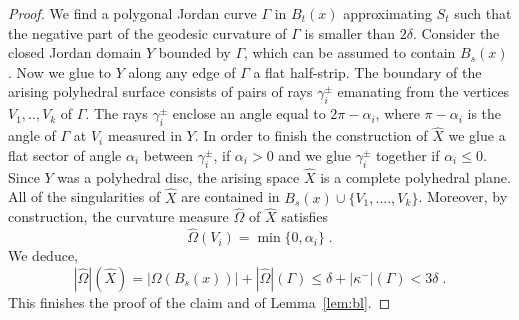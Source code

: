 \documentclass[12pt,leqno,intlimits]{amsart}
\numberwithin{equation}{section}
\theoremstyle{definition}
\theoremstyle{remark}
\newcommand{\lref}[1]{Lemma~\ref{#1}}
\begin{document}
\begin{proof}
We find a polygonal Jordan curve $\Gamma$ in $B_t(x)$  approximating $S_t$  such that the negative part of the geodesic curvature of $\Gamma$ is smaller than $2\delta$.  Consider the closed Jordan domain  $Y$ bounded by $\Gamma$, which can be assumed to contain $B_s(x)$.
Now we glue to $Y$ along any edge of $\Gamma$ a flat half-strip.  The boundary of the arising polyhedral surface  consists of pairs of rays
$\gamma _i ^{\pm}$  emanating from the vertices $V_1,..,V_k$ of $\Gamma$. The rays $\gamma _i^{\pm}$ enclose an angle equal to $2\pi- \alpha _i$, where $\pi-\alpha _i$ is the angle of $\Gamma$ at $V_i$ measured in $Y$.   In order to finish the construction of $\hat X$ we glue  a flat sector of
angle $\alpha _i$ between $\gamma _i ^{\pm}$, if $\alpha _i >0$ and we glue $\gamma _i^{\pm}$ together if $\alpha _i \leq 0$.
Since $Y$ was a polyhedral disc, the arising space $\hat X$ is a complete polyhedral plane.
 All of the singularities of $\hat X$  are contained in $B_s(x) \cup \{ V_1,...., V_k\}$. Moreover, by construction, the curvature measure
   $\hat \Omega$ of $\hat X$ satisfies
   $$\hat \Omega  (V_i) = \min \{ 0, \alpha _i \} \;.$$
  We deduce,
  $$|\hat \Omega | ( \hat X) = |\Omega (B_s (x))| + |\hat \Omega | ( \Gamma ) \leq \delta  + |\kappa ^-| (\Gamma ) < 3 \delta \;.$$
    This finishes the proof of the claim and of \lref{lem:bl}.
\end{proof}
\end{document}
